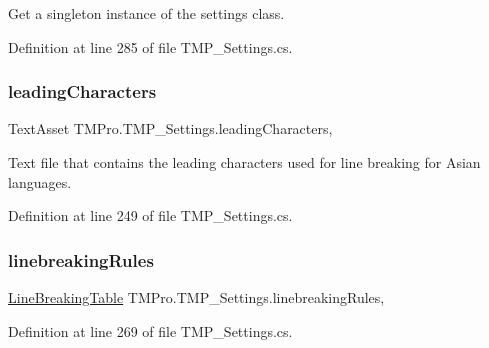 Get a singleton instance of the settings class. 



Definition at line 285 of file T\+M\+P\+\_\+\+Settings.\+cs.

\mbox{\label{class_t_m_pro_1_1_t_m_p___settings_a7f094fc99cec843b82d393fd3f3b2d25}} 
\subsubsection{\texorpdfstring{leadingCharacters}{leadingCharacters}}
{\footnotesize\ttfamily Text\+Asset T\+M\+Pro.\+T\+M\+P\+\_\+\+Settings.\+leading\+Characters\hspace{0.3cm}{\ttfamily [static]}, {\ttfamily [get]}}



Text file that contains the leading characters used for line breaking for Asian languages. 



Definition at line 249 of file T\+M\+P\+\_\+\+Settings.\+cs.

\mbox{\label{class_t_m_pro_1_1_t_m_p___settings_a5db629ee06cfa2c662645f18325b7db5}} 
\subsubsection{\texorpdfstring{linebreakingRules}{linebreakingRules}}
{\footnotesize\ttfamily \mbox{\hyperlink{class_t_m_pro_1_1_t_m_p___settings_1_1_line_breaking_table}{Line\+Breaking\+Table}} T\+M\+Pro.\+T\+M\+P\+\_\+\+Settings.\+linebreaking\+Rules\hspace{0.3cm}{\ttfamily [static]}, {\ttfamily [get]}}







Definition at line 269 of file T\+M\+P\+\_\+\+Settings.\+cs.

\mbox{\label{class_t_m_pro_1_1_t_m_p___settings_a36e3ac5a0d8d49a625078c41791a5139}} 
